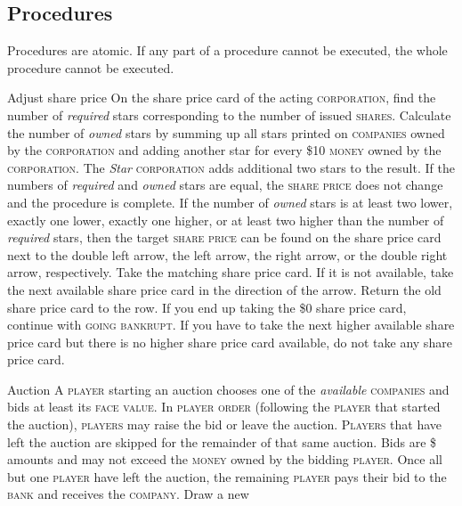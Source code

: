 \documentclass[11pt,a4paper]{article}
\newenvironment{my_description}
  {\begin{list}{}{\setlength{\labelwidth}{0pt}
   \leftmargin=1.2em
   \setlength{\itemindent}{-\leftmargin}
   \renewcommand{\makelabel}{\descriptionlabel}}
  \setlength{\itemsep}{1pt}
  \setlength{\parskip}{0pt}
  \setlength{\parsep}{0pt}
  }
  {\end{list}}
\begin{document}
\begin{multicols}{2}
{\subsection*{Procedures}

Procedures are atomic. If any part of a procedure cannot be executed,
the whole procedure cannot be executed.

\begin{my_description}
\item[Adjust share price] On the share price card of the acting
  \textsc{corporation}, find the number of \emph{required} stars
  corresponding to the number of issued \textsc{shares}. Calculate the
  number of \emph{owned} stars by summing up all stars printed on
  \textsc{companies} owned by the \textsc{corporation} and adding
  another star for every \$10 \textsc{money} owned by the
  \textsc{corporation}. The \emph{Star} \textsc{corporation} adds
  additional two stars to the result. If the numbers of
  \emph{required} and \emph{owned} stars are equal, the \textsc{share
    price} does not change and the procedure is complete. If the
  number of \emph{owned} stars is at least two lower, exactly one
  lower, exactly one higher, or at least two higher than the number of
  \emph{required} stars, then the target \textsc{share price} can be
  found on the share price card next to the double left arrow, the
  left arrow, the right arrow, or the double right arrow,
  respectively. Take the matching share price card. If it is not
  available, take the next available share price card in the direction
  of the arrow. Return the old share price card to the row. If you end
  up taking the \$0 share price card, continue with \textsc{going
    bankrupt}. If you have to take the next higher available share
  price card but there is no higher share price card available, do not
  take any share price card.
\item[Auction] A \textsc{player} starting an auction chooses one of
  the \emph{available} \textsc{companies} and bids at least its
  \textsc{face value}. In \textsc{player order} (following the
  \textsc{player} that started the auction), \textsc{players} may
  raise the bid or leave the auction. \textsc{Players} that have left
  the auction are skipped for the remainder of that same auction. Bids
  are \$ amounts and may not exceed the \textsc{money} owned by the
  bidding \textsc{player}. Once all but one \textsc{player} have left
  the auction, the remaining \textsc{player} pays their bid to the
  \textsc{bank} and receives the \textsc{company}. Draw a new

\end{my_description}}
\end{multicols}
\end{document}
